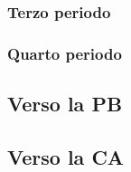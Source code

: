 \subsubsection{Terzo periodo}
\subsubsection{Quarto periodo}

\subsection{Verso la PB}

\subsection{Verso la CA}
